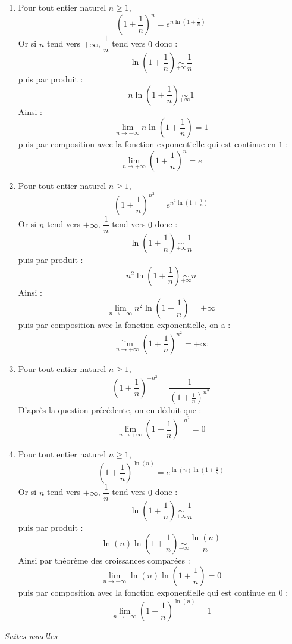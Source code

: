 \documentclass[a4paper,10pt]{report}
\begin{document}
\begin{enumerate}
\item Pour tout entier naturel $n \geq 1$,
$$ \left( 1 + \frac{1}{n} \right)^n = e^{n \ln \left(1 + \frac{1}{n} \right)}$$
Or si $n$ tend vers $+ \infty$, $\dfrac{1}{n}$ tend vers $0$ donc :
$$  \ln \left(1 + \frac{1}{n} \right) \underset{ + \infty}{\sim} \frac{1}{n}$$
puis par produit :
$$ n \ln \left(1 + \frac{1}{n} \right) \underset{ + \infty}{\sim} 1$$
Ainsi :
$$ \lim_{n \rightarrow + \infty} n \ln \left(1 + \frac{1}{n} \right) = 1$$
puis par composition avec la fonction exponentielle qui est continue en $1$ : 
$$ \lim_{n \rightarrow + \infty} \left( 1 + \frac{1}{n} \right)^n = e$$
\item Pour tout entier naturel $n \geq 1$,
$$ \left( 1 + \frac{1}{n} \right)^{n^2} = e^{n^2 \ln \left(1 + \frac{1}{n} \right)}$$
Or si $n$ tend vers $+ \infty$, $\dfrac{1}{n}$ tend vers $0$ donc :
$$  \ln \left(1 + \frac{1}{n} \right) \underset{ + \infty}{\sim} \frac{1}{n}$$
puis par produit :
$$ n^2 \ln \left(1 + \frac{1}{n} \right) \underset{ + \infty}{\sim} n$$
Ainsi :
$$ \lim_{n \rightarrow + \infty} n^2 \ln \left(1 + \frac{1}{n} \right) = + \infty$$
puis par composition avec la fonction exponentielle, on a :
$$ \lim_{n \rightarrow + \infty} \left( 1 + \frac{1}{n} \right)^{n^2} = + \infty$$
\item Pour tout entier naturel $n \geq 1$,
$$ \left(1+ \frac{1}{n}\right)^{-n^2} = \dfrac{1}{\left(1+ \frac{1}{n}\right)^{n^2}}$$
D'après la question précédente, on en déduit que :
$$ \lim_{n \rightarrow + \infty} \left(1+ \frac{1}{n}\right)^{-n^2} = 0$$
\item Pour tout entier naturel $n \geq 1$,
$$ \left( 1 + \frac{1}{n} \right)^{\ln(n)} = e^{\ln(n) \ln \left(1 + \frac{1}{n} \right)}$$
Or si $n$ tend vers $+ \infty$, $\dfrac{1}{n}$ tend vers $0$ donc :
$$  \ln \left(1 + \frac{1}{n} \right) \underset{ + \infty}{\sim} \frac{1}{n}$$
puis par produit :
$$ \ln(n) \ln \left(1 + \frac{1}{n} \right) \underset{ + \infty}{\sim} \dfrac{\ln(n)}{n}$$
Ainsi par théorème des croissances comparées :
$$ \lim_{n \rightarrow + \infty} \ln(n) \ln \left(1 + \frac{1}{n} \right) = 0$$
puis par composition avec la fonction exponentielle qui est continue en $0$ : 
$$ \lim_{n \rightarrow + \infty} \left( 1 + \frac{1}{n} \right)^{\ln(n)} = 1$$
\end{enumerate}

\medskip

\begin{center}
\textit{{ {\large Suites usuelles}}}
\end{center}
\end{document}
